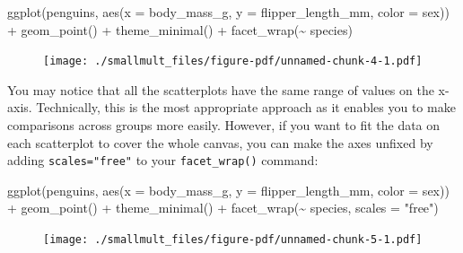 \documentclass[
  letterpaper,
  DIV=11,
  numbers=noendperiod]{scrreprt}
\newenvironment{Shaded}{\begin{snugshade}}{\end{snugshade}}
\newcommand{\AttributeTok}[1]{\textcolor[rgb]{0.40,0.45,0.13}{#1}}
\newcommand{\FunctionTok}[1]{\textcolor[rgb]{0.28,0.35,0.67}{#1}}
\newcommand{\NormalTok}[1]{\textcolor[rgb]{0.00,0.23,0.31}{#1}}
\newcommand{\SpecialCharTok}[1]{\textcolor[rgb]{0.37,0.37,0.37}{#1}}
\newcommand{\StringTok}[1]{\textcolor[rgb]{0.13,0.47,0.30}{#1}}
\begin{document}
\begin{Shaded}
\begin{Highlighting}[]
\FunctionTok{ggplot}\NormalTok{(penguins, }\FunctionTok{aes}\NormalTok{(}\AttributeTok{x =}\NormalTok{ body\_mass\_g,  }\AttributeTok{y =}\NormalTok{ flipper\_length\_mm, }\AttributeTok{color =}\NormalTok{ sex)) }\SpecialCharTok{+} 
  \FunctionTok{geom\_point}\NormalTok{() }\SpecialCharTok{+}
  \FunctionTok{theme\_minimal}\NormalTok{() }\SpecialCharTok{+}
  \FunctionTok{facet\_wrap}\NormalTok{(}\SpecialCharTok{\textasciitilde{}}\NormalTok{ species)}
\end{Highlighting}
\end{Shaded}

\begin{figure}[H]

{\centering \texttt{[image: ./smallmult\_files/figure-pdf/unnamed-chunk-4-1.pdf]}

}

\end{figure}

You may notice that all the scatterplots have the same range of values
on the x-axis. Technically, this is the most appropriate approach as it
enables you to make comparisons across groups more easily. However, if
you want to fit the data on each scatterplot to cover the whole canvas,
you can make the axes unfixed by adding \texttt{scales="free"} to your
\texttt{facet\_wrap()} command:

\begin{Shaded}
\begin{Highlighting}[]
\FunctionTok{ggplot}\NormalTok{(penguins, }\FunctionTok{aes}\NormalTok{(}\AttributeTok{x =}\NormalTok{ body\_mass\_g,  }\AttributeTok{y =}\NormalTok{ flipper\_length\_mm, }\AttributeTok{color =}\NormalTok{ sex)) }\SpecialCharTok{+} 
  \FunctionTok{geom\_point}\NormalTok{() }\SpecialCharTok{+}
  \FunctionTok{theme\_minimal}\NormalTok{() }\SpecialCharTok{+}
  \FunctionTok{facet\_wrap}\NormalTok{(}\SpecialCharTok{\textasciitilde{}}\NormalTok{ species, }\AttributeTok{scales =} \StringTok{"free"}\NormalTok{)}
\end{Highlighting}
\end{Shaded}

\begin{figure}[H]

{\centering \texttt{[image: ./smallmult\_files/figure-pdf/unnamed-chunk-5-1.pdf]}

}

\end{figure}
\end{document}
